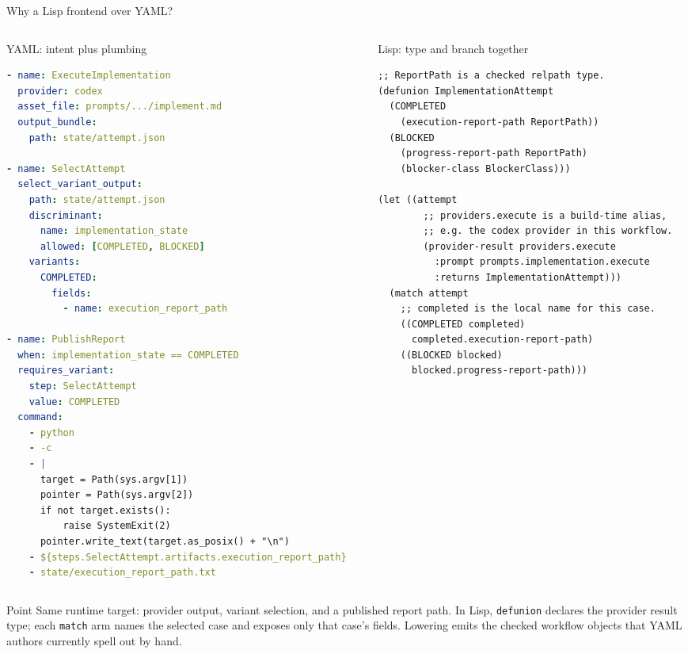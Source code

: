\documentclass[aspectratio=169]{beamer}
\begin{document}
\begin{frame}[fragile,shrink=12]{Why a Lisp frontend over YAML?}
\scriptsize
\begin{columns}[T,totalwidth=\textwidth]
\begin{column}{0.49\textwidth}
\begin{block}{YAML: intent plus plumbing}
\begin{lstlisting}[language=yaml,basicstyle=\ttfamily\fontsize{4.25}{4.75}\selectfont]
- name: ExecuteImplementation
  provider: codex
  asset_file: prompts/.../implement.md
  output_bundle:
    path: state/attempt.json

- name: SelectAttempt
  select_variant_output:
    path: state/attempt.json
    discriminant:
      name: implementation_state
      allowed: [COMPLETED, BLOCKED]
    variants:
      COMPLETED:
        fields:
          - name: execution_report_path

- name: PublishReport
  when: implementation_state == COMPLETED
  requires_variant:
    step: SelectAttempt
    value: COMPLETED
  command:
    - python
    - -c
    - |
      target = Path(sys.argv[1])
      pointer = Path(sys.argv[2])
      if not target.exists():
          raise SystemExit(2)
      pointer.write_text(target.as_posix() + "\n")
    - ${steps.SelectAttempt.artifacts.execution_report_path}
    - state/execution_report_path.txt
\end{lstlisting}
\end{block}
\end{column}
\begin{column}{0.49\textwidth}
\begin{block}{Lisp: type and branch together}
\begin{lstlisting}[basicstyle=\ttfamily\fontsize{4.7}{5.15}\selectfont]
;; ReportPath is a checked relpath type.
(defunion ImplementationAttempt
  (COMPLETED
    (execution-report-path ReportPath))
  (BLOCKED
    (progress-report-path ReportPath)
    (blocker-class BlockerClass)))

(let ((attempt
        ;; providers.execute is a build-time alias,
        ;; e.g. the codex provider in this workflow.
        (provider-result providers.execute
          :prompt prompts.implementation.execute
          :returns ImplementationAttempt)))
  (match attempt
    ;; completed is the local name for this case.
    ((COMPLETED completed)
      completed.execution-report-path)
    ((BLOCKED blocked)
      blocked.progress-report-path)))
\end{lstlisting}
\end{block}
\end{column}
\end{columns}

\vspace{0.25em}
\begin{block}{Point}
\fontsize{6.15}{6.85}\selectfont
Same runtime target: provider output, variant selection, and a published report
path. In Lisp, \texttt{defunion} declares the provider result type; each
\texttt{match} arm names the selected case and exposes only that case's fields.
Lowering emits the checked workflow objects that YAML authors currently spell
out by hand.
\end{block}
\end{frame}
\end{document}
